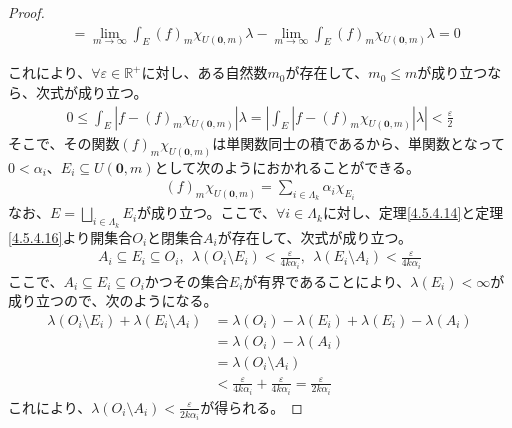 \documentclass[dvipdfmx]{jsarticle}
\begin{document}
\begin{proof}
\begin{align*}
&= \lim_{m \rightarrow \infty}{\int_{E} {(f)_{m}\chi_{U\left( \mathbf{0},m \right)}\lambda}} - \lim_{m \rightarrow \infty}{\int_{E} {(f)_{m}\chi_{U\left( \mathbf{0},m \right)}\lambda}} = 0
\end{align*}\par
これにより、$\forall\varepsilon \in \mathbb{R}^{+}$に対し、ある自然数$m_{0}$が存在して、$m_{0} \leq m$が成り立つなら、次式が成り立つ。
\begin{align*}
0 \leq \int_{E} {\left| f - (f)_{m}\chi_{U\left( \mathbf{0},m \right)} \right|\lambda} = \left| \int_{E} {\left| f - (f)_{m}\chi_{U\left( \mathbf{0},m \right)} \right|\lambda} \right| < \frac{\varepsilon}{2}
\end{align*}
そこで、その関数$(f)_{m}\chi_{U\left( \mathbf{0},m \right)}$は単関数同士の積であるから、単関数となって$0 < \alpha_{i}$、$E_{i} \subseteq U\left( \mathbf{0},m \right)$として次のようにおかれることができる。
\begin{align*}
(f)_{m}\chi_{U\left( \mathbf{0},m \right)} = \sum_{i \in \varLambda_{k}} {\alpha_{i}\chi_{E_{i}}}
\end{align*}
なお、$E = \bigsqcup_{i \in \varLambda_{k}} E_{i}$が成り立つ。ここで、$\forall i \in \varLambda_{k}$に対し、定理\ref{4.5.4.14}と定理\ref{4.5.4.16}より開集合$O_{i}$と閉集合$A_{i}$が存在して、次式が成り立つ。
\begin{align*}
A_{i} \subseteq E_{i} \subseteq O_{i},\ \ \lambda\left( O_{i} \setminus E_{i} \right) < \frac{\varepsilon}{4k\alpha_{i}},\ \ \lambda\left( E_{i} \setminus A_{i} \right) < \frac{\varepsilon}{4k\alpha_{i}}
\end{align*}
ここで、$A_{i} \subseteq E_{i} \subseteq O_{i}$かつその集合$E_{i}$が有界であることにより、$\lambda\left( E_{i} \right) < \infty$が成り立つので、次のようになる。
\begin{align*}
\lambda\left( O_{i} \setminus E_{i} \right) + \lambda\left( E_{i} \setminus A_{i} \right) &= \lambda\left( O_{i} \right) - \lambda\left( E_{i} \right) + \lambda\left( E_{i} \right) - \lambda\left( A_{i} \right)\\
&= \lambda\left( O_{i} \right) - \lambda\left( A_{i} \right)\\
&= \lambda\left( O_{i} \setminus A_{i} \right)\\
&< \frac{\varepsilon}{4k\alpha_{i}} + \frac{\varepsilon}{4k\alpha_{i}} = \frac{\varepsilon}{2k\alpha_{i}}
\end{align*}
これにより、$\lambda\left( O_{i} \setminus A_{i} \right) < \frac{\varepsilon}{2k\alpha_{i}}$が得られる。\par

\end{proof}
\end{document}
